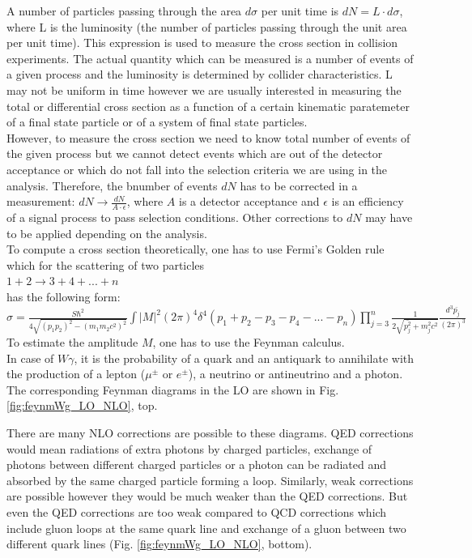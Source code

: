A number of particles passing through the area $d\sigma$ per unit time is $dN=L \cdot d\sigma$, where L is the luminosity (the number of particles passing through the unit area per unit time). This expression is used to measure the cross section in collision experiments. The actual quantity which can be measured is a number of events of a given process and the luminosity is determined by collider characteristics. L may not be uniform in time however we are usually interested in measuring the total or differential cross section as a function of a certain kinematic paratemeter of a final state particle or of a system of final state particles.\\  
However, to measure the cross section we need to know total number of events of the given process but we cannot detect events which are out of the detector acceptance or which do not fall into the selection criteria we are using in the analysis. Therefore, the bnumber of events $dN$ has to be corrected in a measurement: $dN \rightarrow \frac{dN}{A \cdot \epsilon}$, where $A$ is a detector acceptance and $\epsilon$ is an efficiency of a signal process to pass selection conditions. Other corrections to $dN$ may have to be applied depending on the analysis.\\ 

To compute a cross section theoretically, one has to use Fermi's Golden rule which for the scattering of two particles\\
$1+2\rightarrow 3+4+...+n$\\
has the following form:\\

$\sigma = \frac{S \hbar^2 }{4\sqrt{(p_1p_2)^2-(m_1m_2c^2)^2}} \int |M|^2 (2\pi)^4 \delta^4(p_1+p_2-p_3-p_4-...-p_n) \prod_{j=3}^{n} \frac{1}{2 \sqrt{\bar{p_j^2}+m_j^2 c^2}}\frac{d^3\bar{p_j}}{(2\pi)^3} $\\

To estimate the amplitude $M$, one has to use the Feynman calculus.\\

In case of $W\gamma$, it is the probability of a quark and an antiquark to annihilate with the production of a lepton ($\mu^{\pm}$ or $e^{\pm}$), a neutrino or antineutrino and a photon. The corresponding Feynman diagrams in the LO are shown in Fig. \ref{fig:feynmWg_LO_NLO}, top. 

There are many NLO corrections are possible to these diagrams. QED corrections would mean radiations of extra photons by charged particles, exchange of photons between different charged particles or a photon can be radiated and absorbed by the same charged particle forming a loop. Similarly, weak corrections are possible however they would be much weaker than the QED corrections. But even the QED corrections are too weak compared to QCD corrections which include gluon loops at the same quark line and exchange of a gluon between two different quark lines (Fig. \ref{fig:feynmWg_LO_NLO}, bottom).

